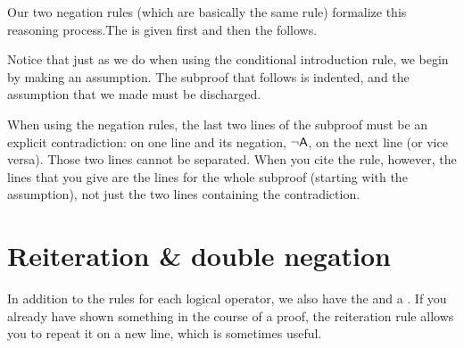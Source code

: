 Our two negation rules (which are basically the same rule) formalize this reasoning process.The  is given first and then the  follows.


\noindent Notice that just as we do when using the conditional introduction rule, we begin by making an assumption. The subproof that follows is indented, and the assumption that we made must be discharged. 

When using the negation rules, the last two lines of the subproof must be an explicit contradiction:  on one line and its negation, ${\neg}\mathsf{A}$, on the next line (or vice versa). Those two lines cannot be separated. When you cite the rule, however, the lines that you give are the lines for the whole subproof (starting with the assumption), not just the two lines containing the contradiction. 



\section{Reiteration \& double negation}
In addition to the rules for each logical operator, we also have the  and a . If you already have shown something in the course of a proof, the reiteration rule allows you to repeat it on a new line, which is sometimes useful.  

